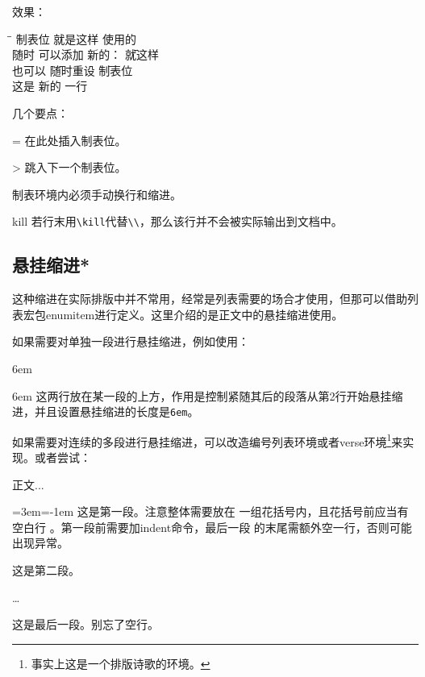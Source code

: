 效果：
\begin{tabbing}
\hspace{4em}\=\hspace{8em}\=\kill
制表位 \> 就是这样 \> 使用的 \\
随时 \> 可以添加 \> 新的： \= 就这样 \\
也可以 \= 随时重设 \= 制表位 \\
这是 \> 新的 \> 一行
\end{tabbing}

几个要点：
\begin{para}
\item[\char92{}=] 在此处插入制表位。
\item[\char92{}>] 跳入下一个制表位。
\item[\char92{}\char92{}] 制表环境内必须手动换行和缩进。
\item[\char92{}kill] 若行末用\verb|\kill|代替\verb|\\|，那么该行并不会被实际输出到文档中。
\end{para}

\subsection{悬挂缩进*}
这种缩进在实际排版中并不常用，经常是列表需要的场合才使用，但那可以借助列表宏包enumitem进行定义。这里介绍的是正文中的悬挂缩进使用。

如果需要对单独一段进行悬挂缩进，例如使用：
\begin{latex}{}
\hangindent 6em
\end{latex}

\hangindent 6em
这两行放在某一段的上方，作用是控制紧随其后的段落从第2行开始悬挂缩进，并且设置悬挂缩进的长度是\texttt{6em}。

如果需要对连续的多段进行悬挂缩进，可以改造编号列表环境或者verse环境\footnote{事实上这是一个排版诗歌的环境。}来实现。或者尝试：

\begin{codeshow}
正文...

{\leftskip=3em\parindent=-1em
\indent 这是第一段。注意整体需要放在
一组花括号内，且花括号前应当有空白行
。第一段前需要加indent命令，最后一段
的末尾需额外空一行，否则可能出现异常。

这是第二段。

\ldots

这是最后一段。别忘了空行。

}
\end{codeshow}

